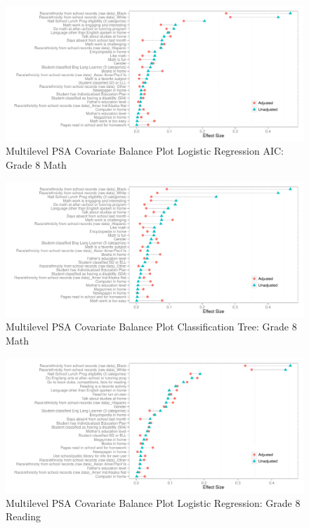 \documentclass[letterpaper,12p,twoside]{article} %
\begin{document}
\begin{figure}[h!]
\begin{center}
\includegraphics[width=\textwidth]{../Figures2009/g8math-mlpsa-lrAIC-balance.pdf}
\caption{Multilevel PSA Covariate Balance Plot Logistic Regression AIC: Grade 8 Math}
\end{center}
\end{figure}

\begin{figure}[h!]
\begin{center}
\includegraphics[width=\textwidth]{../Figures2009/g8math-mlpsa-ctree-balance.pdf}
\caption{Multilevel PSA Covariate Balance Plot Classification Tree: Grade 8 Math}
\end{center}
\end{figure}

\begin{figure}[h!]
\begin{center}
\includegraphics[width=\textwidth]{../Figures2009/g8read-mlpsa-lr-balance.pdf}
\caption{Multilevel PSA Covariate Balance Plot Logistic Regression: Grade 8 Reading}
\end{center}
\end{figure}
\end{document}
